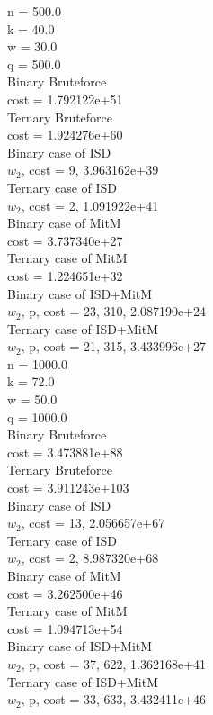 \documentclass[12pt]{article}
\begin{document}
n = 500.0 \\
k = 40.0 \\
w = 30.0 \\
q = 500.0 \\
Binary Bruteforce \\
cost = 1.792122e+51 \\
Ternary Bruteforce \\
cost = 1.924276e+60 \\
Binary case of ISD \\
$w_2$, cost = 9, 3.963162e+39 \\
Ternary case of ISD \\
$w_2$, cost = 2, 1.091922e+41 \\
Binary case of MitM \\
cost = 3.737340e+27 \\
Ternary case of MitM \\
cost = 1.224651e+32 \\
Binary case of ISD+MitM \\
$w_2$, p, cost = 23, 310, 2.087190e+24 \\
Ternary case of ISD+MitM \\
$w_2$, p, cost = 21, 315, 3.433996e+27 \\



n = 1000.0 \\
k = 72.0 \\
w = 50.0 \\
q = 1000.0 \\
Binary Bruteforce \\
cost = 3.473881e+88 \\
Ternary Bruteforce \\
cost = 3.911243e+103 \\
Binary case of ISD \\
$w_2$, cost = 13, 2.056657e+67 \\
Ternary case of ISD \\
$w_2$, cost = 2, 8.987320e+68 \\
Binary case of MitM \\
cost = 3.262500e+46 \\
Ternary case of MitM \\
cost = 1.094713e+54 \\
Binary case of ISD+MitM \\
$w_2$, p, cost = 37, 622, 1.362168e+41 \\
Ternary case of ISD+MitM \\
$w_2$, p, cost = 33, 633, 3.432411e+46 \\
\end{document}

